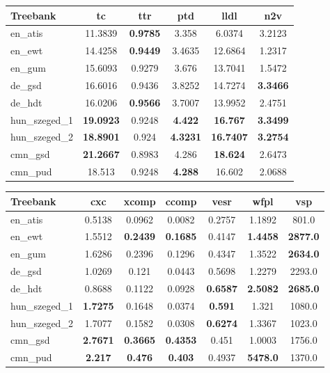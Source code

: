 \begin{table*}
\centering
\begin{tabularx}{\textwidth}{Xccccc}
\hline
\textbf{Treebank} & \textbf{tc} & \textbf{ttr} & \textbf{ptd} & \textbf{lldl} & \textbf{n2v} \\
\hline
en\_atis & 11.3839 & \textbf{0.9785} & 3.358 & 6.0374 & 3.2123 \\
\hline
en\_ewt & 14.4258 & \textbf{0.9449} & 3.4635 & 12.6864 & 1.2317 \\
\hline
en\_gum & 15.6093 & 0.9279 & 3.676 & 13.7041 & 1.5472 \\
\hline
de\_gsd & 16.6016 & 0.9436 & 3.8252 & 14.7274 & \textbf{3.3466} \\
\hline
de\_hdt & 16.0206 & \textbf{0.9566} & 3.7007 & 13.9952 & 2.4751 \\
\hline
hun\_szeged\_1 & \textbf{19.0923} & 0.9248 & \textbf{4.422} & \textbf{16.767} & \textbf{3.3499} \\
\hline
hun\_szeged\_2 & \textbf{18.8901} & 0.924 & \textbf{4.3231} & \textbf{16.7407} & \textbf{3.2754} \\
\hline
cmn\_gsd & \textbf{21.2667} & 0.8983 & 4.286 & \textbf{18.624} & 2.6473 \\
\hline
cmn\_pud & 18.513 & 0.9248 & \textbf{4.288} & 16.602 & 2.0688 \\
\hline
\end{tabularx}

\vspace{0.5cm}

\begin{tabularx}{\textwidth}{Xcccccc}
\hline
\textbf{Treebank} & \textbf{cxc} & \textbf{xcomp} & \textbf{ccomp} & \textbf{vesr} & \textbf{wfpl} & \textbf{vsp} \\
\hline
en\_atis & 0.5138 & 0.0962 & 0.0082 & 0.2757 & 1.1892 & 801.0 \\
\hline
en\_ewt & 1.5512 & \textbf{0.2439} & \textbf{0.1685} & 0.4147 & \textbf{1.4458} & \textbf{2877.0} \\
\hline
en\_gum & 1.6286 & 0.2396 & 0.1296 & 0.4347 & 1.3522 & \textbf{2634.0} \\
\hline
de\_gsd & 1.0269 & 0.121 & 0.0443 & 0.5698 & 1.2279 & 2293.0 \\
\hline
de\_hdt & 0.8688 & 0.1122 & 0.0928 & \textbf{0.6587} & \textbf{2.5082} & \textbf{2685.0} \\
\hline
hun\_szeged\_1 & \textbf{1.7275} & 0.1648 & 0.0374 & \textbf{0.591} & 1.321 & 1080.0 \\
\hline
hun\_szeged\_2 & 1.7077 & 0.1582 & 0.0308 & \textbf{0.6274} & 1.3367 & 1023.0 \\
\hline
cmn\_gsd & \textbf{2.7671} & \textbf{0.3665} & \textbf{0.4353} & 0.451 & 1.0003 & 1756.0 \\
\hline
cmn\_pud & \textbf{2.217} & \textbf{0.476} & \textbf{0.403} & 0.4937 & \textbf{5478.0} & 1370.0 \\
\hline
\end{tabularx}
\caption{Results on official UD treebanks. Top 3 values are highlighted for each metric.}
\label{tab:results}
\end{table*}